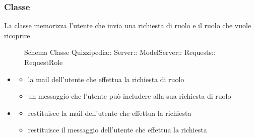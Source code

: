 \subsubsection{Classe }
La classe memorizza l'utente che invia una richiesta di ruolo e il ruolo che vuole ricoprire.
\begin{figure}[H]
\centering
\noindent{}
\caption[Schema Classe RequestRole]{Schema Classe Quizzipedia:: Server:: ModelServer:: Requests:: RequestRole}
\end{figure}
\begin{itemize}
\item {}
\begin{itemize}
\item {}
\newline
la mail dell'utente che effettua la richiesta di ruolo
\item {}
\newline
un messaggio che l'utente può includere alla sua richiesta di ruolo
\end{itemize}
\item {}
\begin{itemize}
\item {}
\newline
restituisce la mail dell'utente che effettua la richiesta
\newline
\item {}
\newline
restituisce il messaggio dell'utente che effettua la richiesta
\newline
\end{itemize}
\end{itemize}
